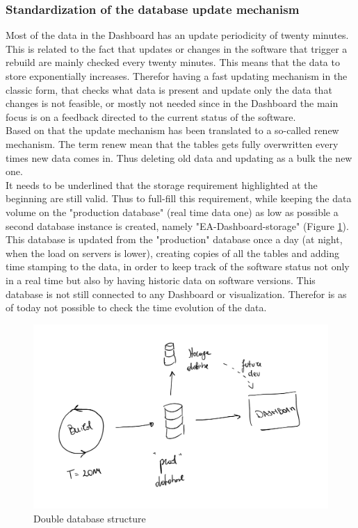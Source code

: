\documentclass[../main.tex]{subfiles}
\begin{document}
\subsubsection{Standardization of the database update mechanism}
Most of the data in the Dashboard has an update periodicity of twenty minutes. This is related to the fact that updates or changes in the software that trigger a rebuild are mainly checked every twenty minutes. This means that the data to store exponentially increases. Therefor having a fast updating mechanism in the classic form, that checks what data is present and update only the data that changes is not feasible, or mostly not needed since in the Dashboard the main focus is on a feedback directed to the current status of the software.\\
Based on that the update mechanism has been translated to a so-called renew mechanism. The term renew mean that the tables gets fully overwritten every times new data comes in. Thus deleting old data and updating as a bulk the new one.\\
It needs to be underlined that the storage requirement highlighted at the beginning are still valid. Thus to full-fill this requirement, while keeping the data volume on the "production database" (real time data one) as low as possible a second database instance is created, namely "EA-Dashboard-storage" (Figure \ref{fig:dds}). This database is updated from the "production" database once a day (at night, when the load on servers is lower), creating copies of all the tables and adding time stamping to the data, in order to keep track of the software status not only in a real time  but also by having historic data on software versions. This database is not still connected to any Dashboard or visualization. Therefor is as of today not possible to check the time evolution of the data. 
\begin{figure}[h]
    \centering
    \includegraphics[width=\linewidth]{images_folder/dual_db.png}
    \caption{Double database structure}
    \label{fig:dds}
\end{figure}
\end{document}
